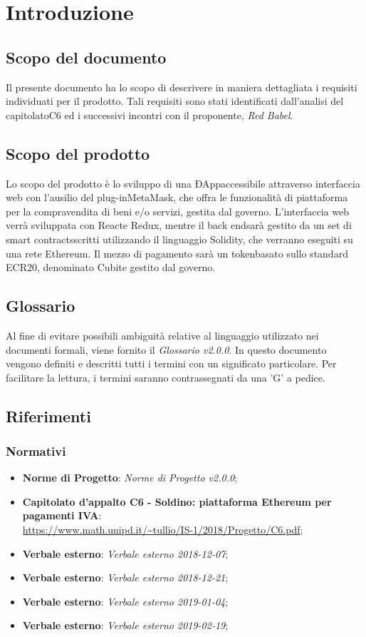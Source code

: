 \section{Introduzione} 
\subsection{Scopo del documento}
Il presente documento ha lo scopo di descrivere in maniera dettagliata i requisiti individuati per il prodotto. Tali requisiti sono stati identificati dall'analisi del capitolato\glosp C6 ed i successivi incontri con il proponente, \textit{Red Babel}.
\subsection{Scopo del prodotto}
Lo scopo del prodotto è lo sviluppo di una ÐApp\glosp accessibile attraverso interfaccia web con l'ausilio del plug-in\glosp MetaMask\glo, che offra le funzionalità di piattaforma per la compravendita di beni e/o servizi, gestita dal governo\glo. L'interfaccia web verrà sviluppata con React\glosp e Redux\glo, mentre il back end\glosp sarà gestito da un set di smart contracts\glosp scritti utilizzando il linguaggio Solidity\glo, che verranno eseguiti su una rete Ethereum\glo.  Il mezzo di pagamento sarà un token\glosp basato sullo standard ECR20\glo, denominato Cubit\glosp e gestito dal governo\glo.

\subsection{Glossario}
Al fine di evitare possibili ambiguità relative al linguaggio utilizzato nei documenti formali, viene fornito il \textit{Glossario v2.0.0}. In questo documento vengono definiti e descritti tutti i termini con un significato particolare. Per facilitare la lettura, i termini saranno contrassegnati da una 'G' a pedice.
\subsection{Riferimenti}
\subsubsection{Normativi}
\begin{itemize}
	\item \textbf{Norme di Progetto}: \textit{Norme di Progetto v2.0.0};

	\item \textbf{Capitolato d'appalto C6 - Soldino: piattaforma Ethereum per pagamenti IVA}: \\ \url{ https://www.math.unipd.it/~tullio/IS-1/2018/Progetto/C6.pdf};
	\item \textbf{Verbale esterno}: \textit{Verbale esterno 2018-12-07};
	\item \textbf{Verbale esterno}: \textit{Verbale esterno 2018-12-21};
	\item \textbf{Verbale esterno}: \textit{Verbale esterno 2019-01-04};
	\item \textbf{Verbale esterno}: \textit{Verbale esterno 2019-02-19};
	
\end{itemize}
